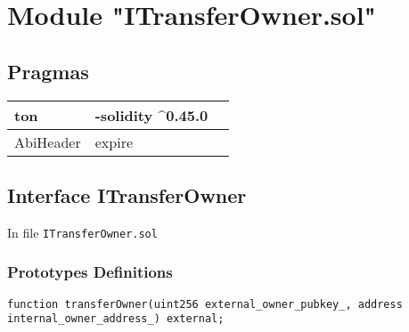 
\section{Module "ITransferOwner.sol"}


\subsection{Pragmas}


\noindent\begin{tabular}{|l|l|p{5cm}|}\hline
ton & -solidity \^{}0.45.0 &\\\hline
AbiHeader &  expire &\\\hline
\end{tabular}


\subsection{Interface ITransferOwner}


In file {\tt ITransferOwner.sol}

\subsubsection{Prototypes Definitions}

\vspace{2cm}

\begin{lstlisting}[firstnumber=5]
    function transferOwner(uint256 external_owner_pubkey_, address internal_owner_address_) external;
\end{lstlisting}
